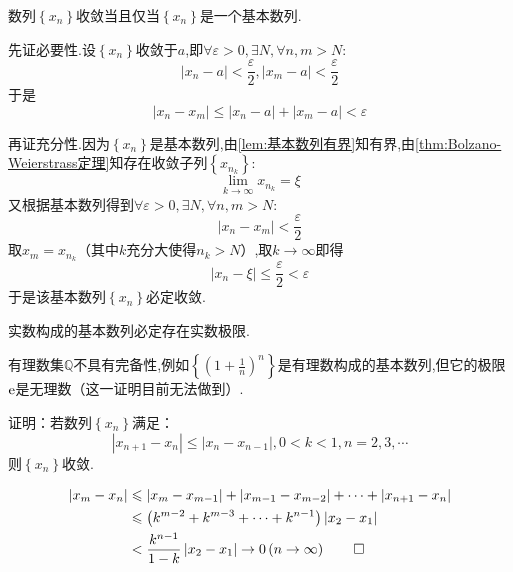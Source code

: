 \begin{formal}
    \begin{theorem}\label{thm:Cauchy收敛原理/实数系的完备性}
        数列$\left\{x_n\right\}$收敛当且仅当$\left\{x_n\right\}$是一个基本数列.
    \end{theorem}
    \begin{Proof}
        先证必要性.设$\left\{x_n\right\}$收敛于$a$,即$\forall\varepsilon>0,\exists N,\forall n,m>N:$\[
        \left|x_n-a\right|<\frac{\varepsilon}{2},\left|x_m-a\right|<\frac{\varepsilon}{2}
        \]于是\[
        \left|x_n-x_m\right|\leqslant\left|x_n-a\right|+\left|x_m-a\right|<\varepsilon
        \]

        再证充分性.因为$\left\{x_n\right\}$是基本数列,由\cref{lem:基本数列有界}知有界,由\cref{thm:Bolzano-Weierstrass定理}知存在收敛子列$\left\{x_{n_k}\right\}:$\[
        \lim_{k\to\infty}x_{n_k}=\xi
        \]又根据基本数列得到$\forall \varepsilon>0,\exists N,\forall n,m>N:$\[
        \left|
            x_n-x_m
        \right|<\frac{\varepsilon}{2}
        \]取$x_m=x_{n_k}$（其中$k$充分大使得$n_k>N$）,取$k\to\infty$即得\[
        \left|
            x_n-\xi
        \right|\leqslant\frac{\varepsilon}{2}<\varepsilon
        \]于是该基本数列$\left\{x_n\right\}$必定收敛.
    \end{Proof}
\end{formal}
\begin{green}
    \begin{corollary}[实数系的完备性]\label{cor:实数系的完备性}
        实数构成的基本数列必定存在实数极限.
    \end{corollary}
\end{green}
\begin{red}
    \begin{remark}
        有理数集$\mathbb{Q}$不具有完备性,例如$\displaystyle\left\{\left(1+\frac{1}{n}\right)^n\right\}$是有理数构成的基本数列,但它的极限$\mathrm{e}$是无理数（这一证明目前无法做到）.
    \end{remark}
\end{red}
\begin{brown}
    \begin{example}
        证明：若数列$\left\{x_n\right\}$满足：\[
        \left|x_{n+1}-x_n\right|\leqslant\left|
            x_n-x_{n-1}
        \right|,0<k<1,n=2,3,\cdots
        \]则$\left\{x_n\right\}$收敛.
    \end{example}
    \begin{Proof}
        \begin{align*}
            \left|x_m-x_n\right|&\leqslant\left|x_m-x_{m-1}\right|+\left|x_{m-1}-x_{m-2}\right|+\cdots+\left|x_{n+1}-x_n\right|\\
            &\leqslant \left(k^{m-2}+k^{m-3}+\cdots+k^{n-1}\right)\left|x_2-x_1\right|\\
            &<\frac{k^{n-1}}{1-k}\left|x_2-x_1\right|\to0\left(n\to\infty\right)\qedhere
        \end{align*}
    \end{Proof}
\end{brown}
